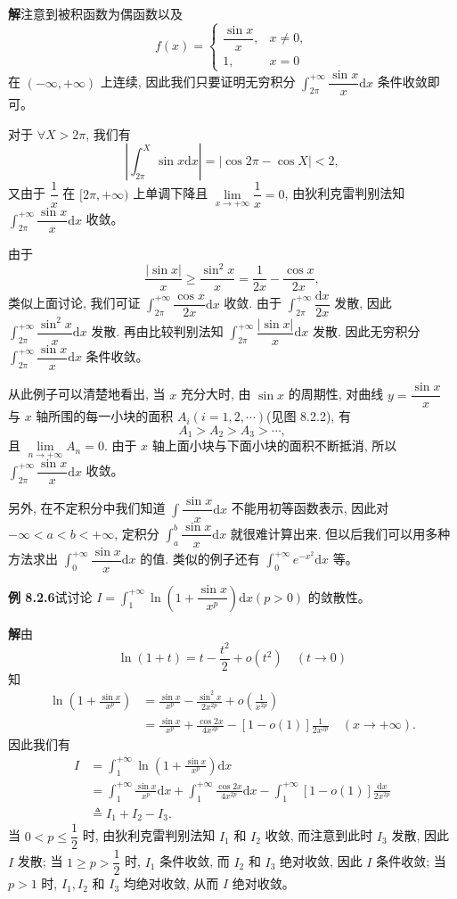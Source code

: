 \documentclass[UTF8,12pt,a4paper,fontset=fandol]{ctexart}
\begin{document}
\noindent\textbf{解}\quad 注意到被积函数为偶函数以及
\[
  f(x)=
  \begin{cases}
    \dfrac{\sin x}{x}, & x\ne0,\\
    1, & x=0
  \end{cases}
\]
在 $(-\infty,+\infty)$ 上连续, 因此我们只要证明无穷积分 $\int_{2\pi}^{+\infty}\dfrac{\sin x}{x}\mathrm dx$ 条件收敛即可。

对于 $\forall X>2\pi$, 我们有
\[
  \left|\int_{2\pi}^X\sin x\mathrm dx\right|
  =
  |\cos2\pi-\cos X|<2,
\]
又由于 $\dfrac1x$ 在 $[2\pi,+\infty)$ 上单调下降且 $\lim\limits_{x\to+\infty}\dfrac1x=0$, 由狄利克雷判别法知 $\int_{2\pi}^{+\infty}\dfrac{\sin x}{x}\mathrm dx$ 收敛。

由于
\[
  \frac{|\sin x|}{x}\geq \frac{\sin^2x}{x}=\frac1{2x}-\frac{\cos x}{2x},
\]
类似上面讨论, 我们可证 $\int_{2\pi}^{+\infty}\dfrac{\cos x}{2x}\mathrm dx$ 收敛. 由于 $\int_{2\pi}^{+\infty}\dfrac{\mathrm dx}{2x}$ 发散, 因此 $\int_{2\pi}^{+\infty}\dfrac{\sin^2x}{x}\mathrm dx$ 发散. 再由比较判别法知 $\int_{2\pi}^{+\infty}\dfrac{|\sin x|}{x}\mathrm dx$ 发散. 因此无穷积分 $\int_{2\pi}^{+\infty}\dfrac{\sin x}{x}\mathrm dx$ 条件收敛。

从此例子可以清楚地看出, 当 $x$ 充分大时, 由 $\sin x$ 的周期性, 对曲线 $y=\dfrac{\sin x}{x}$ 与 $x$ 轴所围的每一小块的面积 $A_i(i=1,2,\cdots)$(见图 8.2.2), 有
\[
  A_1>A_2>A_3>\cdots,
\]
且 $\lim\limits_{n\to+\infty}A_n=0$. 由于 $x$ 轴上面小块与下面小块的面积不断抵消, 所以 $\int_{2\pi}^{+\infty}\dfrac{\sin x}{x}\mathrm dx$ 收敛。

另外, 在不定积分中我们知道 $\int\dfrac{\sin x}{x}\mathrm dx$ 不能用初等函数表示, 因此对 $-\infty<a<b<+\infty$, 定积分 $\int_a^b\dfrac{\sin x}{x}\mathrm dx$ 就很难计算出来. 但以后我们可以用多种方法求出 $\int_0^{+\infty}\dfrac{\sin x}{x}\mathrm dx$ 的值. 类似的例子还有 $\int_0^{+\infty}e^{-x^2}\mathrm dx$ 等。

\noindent\textbf{例 8.2.6}\quad 试讨论 $I=\int_1^{+\infty}\ln\left(1+\dfrac{\sin x}{x^p}\right)\mathrm dx(p>0)$ 的敛散性。

\noindent\textbf{解}\quad 由
\[
  \ln(1+t)=t-\frac{t^2}{2}+o(t^2)\quad(t\to0)
\]
知
\[
\begin{aligned}
  \ln\left(1+\frac{\sin x}{x^p}\right)
  &=
  \frac{\sin x}{x^p}
  -
  \frac{\sin^2x}{2x^{2p}}
  +
  o\left(\frac1{x^{2p}}\right)\\
  &=
  \frac{\sin x}{x^p}
  +
  \frac{\cos2x}{4x^{2p}}
  -
  [1-o(1)]\frac1{2x^{2p}}
  \quad(x\to+\infty).
\end{aligned}
\]
因此我们有
\[
\begin{aligned}
  I
  &=
  \int_1^{+\infty}\ln\left(1+\frac{\sin x}{x^p}\right)\mathrm dx\\
  &=
  \int_1^{+\infty}\frac{\sin x}{x^p}\mathrm dx
  +
  \int_1^{+\infty}\frac{\cos2x}{4x^{2p}}\mathrm dx
  -
  \int_1^{+\infty}[1-o(1)]\frac{\mathrm dx}{2x^{2p}}\\
  &\triangleq I_1+I_2-I_3.
\end{aligned}
\]
当 $0<p\leq\dfrac12$ 时, 由狄利克雷判别法知 $I_1$ 和 $I_2$ 收敛, 而注意到此时 $I_3$ 发散, 因此 $I$ 发散; 当 $1\geq p>\dfrac12$ 时, $I_1$ 条件收敛, 而 $I_2$ 和 $I_3$ 绝对收敛, 因此 $I$ 条件收敛; 当 $p>1$ 时, $I_1,I_2$ 和 $I_3$ 均绝对收敛, 从而 $I$ 绝对收敛。
\end{document}
